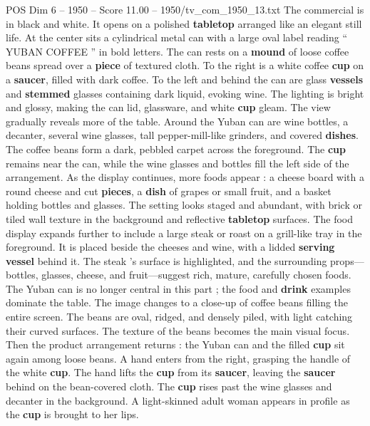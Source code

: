 \begin{textsample}{POS Dim 6 – 1950 – Score 11.00 – 1950/tv\_com\_1950\_13.txt}  \label{ex:f6_pos_018}
The commercial is in black and white.
It opens on a polished \textbf{tabletop} arranged like an elegant still life.
At the center sits a cylindrical metal can with a large oval label reading “ YUBAN COFFEE ” in bold letters.
The can rests on a \textbf{mound} of loose coffee beans spread over a \textbf{piece} of textured cloth.
To the right is a white coffee \textbf{cup} on a \textbf{saucer}, filled with dark coffee.
To the left and behind the can are glass \textbf{vessels} and \textbf{stemmed} glasses containing dark liquid, evoking wine.
The lighting is bright and glossy, making the can lid, glassware, and white \textbf{cup} gleam.
The view gradually reveals more of the table.
Around the Yuban can are wine bottles, a decanter, several wine glasses, tall pepper-mill-like grinders, and covered \textbf{dishes}.
The coffee beans form a dark, pebbled carpet across the foreground.
The \textbf{cup} remains near the can, while the wine glasses and bottles fill the left side of the arrangement.
As the display continues, more foods appear : a cheese board with a round cheese and cut \textbf{pieces}, a \textbf{dish} of grapes or small fruit, and a basket holding bottles and glasses.
The setting looks staged and abundant, with brick or tiled wall texture in the background and reflective \textbf{tabletop} surfaces.
The food display expands further to include a large steak or roast on a grill-like tray in the foreground.
It is placed beside the cheeses and wine, with a lidded \textbf{serving} \textbf{vessel} behind it.
The steak ’s surface is highlighted, and the surrounding props—bottles, glasses, cheese, and fruit—suggest rich, mature, carefully chosen foods.
The Yuban can is no longer central in this part ; the food and \textbf{drink} examples dominate the table.
The image changes to a close-up of coffee beans filling the entire screen.
The beans are oval, ridged, and densely piled, with light catching their curved surfaces.
The texture of the beans becomes the main visual focus.
Then the product arrangement returns : the Yuban can and the filled \textbf{cup} sit again among loose beans.
A hand enters from the right, grasping the handle of the white \textbf{cup}.
The hand lifts the \textbf{cup} from its \textbf{saucer}, leaving the \textbf{saucer} behind on the bean-covered cloth.
The \textbf{cup} rises past the wine glasses and decanter in the background.
A light-skinned adult woman appears in profile as the \textbf{cup} is brought to her lips.

\end{textsample}

